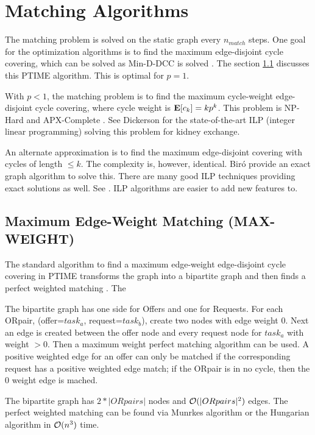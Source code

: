 \documentclass[main.tex]{subfiles}
\begin{document}
\section{Matching Algorithms} \label{sec:algorithms}
The matching problem is solved on the static graph every $n_{match}$ steps. One goal for the optimization algorithms is to find the maximum edge-disjoint cycle covering, which can be solved as Min-D-DCC is solved \cite{Man1} \cite{Bir}. The section \ref{bima} discusses this PTIME algorithm. This is optimal for $p=1$.

With $p<1$, the matching problem is to find the maximum cycle-weight edge-disjoint cycle covering, where cycle weight is $\mathbf{E}[c_k] = k p^k$. This problem is NP-Hard and APX-Complete \cite{Bir}. See Dickerson \cite{Dick} \cite{Dick3} for the state-of-the-art ILP (integer linear programming) solving this problem for kidney exchange.

An alternate approximation is to find the maximum edge-disjoint covering with cycles of length $\leq k$. The complexity is, however, identical. Bir\'{o} \cite{Bir} provide an exact graph algorithm to solve this. There are many good ILP techniques providing exact solutions as well. See \cite{And3} \cite{Glo1} \cite{Pla} \cite{Dick1}. ILP algorithms are easier to add new features to.

\subsection{Maximum Edge-Weight Matching (MAX-WEIGHT)}\label{bima}

The standard algorithm to find a maximum edge-weight edge-disjoint cycle covering in PTIME transforms the graph into a bipartite graph and then finds a perfect weighted matching \cite{Bir}. The

The bipartite graph has one side for Offers and one for Requests. For each ORpair, (offer=$task_a$, request=$task_b$), create two nodes with edge weight $0$. Next an edge is created between the offer node and every request node for $task_a$ with weight $> 0$. Then a maximum weight perfect matching algorithm can be used. A positive weighted edge for an offer can only be matched if the corresponding request has a positive weighted edge match; if the ORpair is in no cycle, then the $0$ weight edge is mached.

The bipartite graph has $2*|ORpairs|$ nodes and $\mathcal{O}(|ORpairs|^2)$ edges. The perfect weighted matching can be found via Munrkes algorithm or the Hungarian algorithm in $\mathcal{O}(n^3)$ time.
\end{document}
